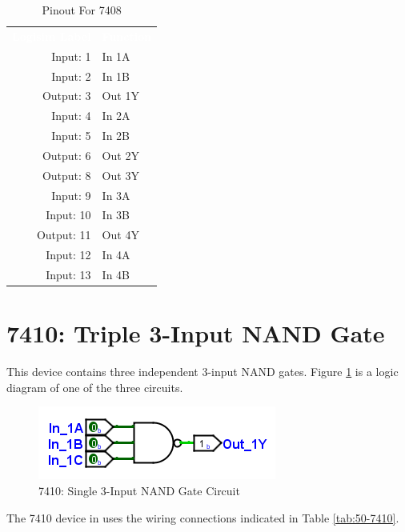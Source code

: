 \begin{table}[H]
	\sffamily
	\newcommand{\head}[1]{\textcolor{white}{\textbf{#1}}}		
	\begin{center}
		\begin{tabular}{rl} 
			\rowcolor{black!75}
			\head{Logisim Label} & \head{Function} \\
			Input: 1   & In 1A  \\
			Input: 2   & In 1B  \\
			Output: 3  & Out 1Y \\
			Input: 4   & In 2A  \\
			Input: 5   & In 2B  \\
			Output: 6  & Out 2Y \\
			Output: 8  & Out 3Y \\
			Input: 9   & In 3A  \\
			Input: 10  & In 3B  \\
			Output: 11 & Out 4Y \\
			Input: 12  & In 4A  \\
			Input: 13  & In 4B  \\
		\end{tabular}
	\end{center}
	\caption{Pinout For 7408}
	\label{tab:50-7408}
\end{table}

\section{7410: Triple 3-Input NAND Gate}

This device contains three independent 3-input NAND gates. Figure \ref{fig:app_ttl-7410} is a logic diagram of one of the three circuits.

\begin{figure}[H]
	\centering
	\includegraphics{gfx/app_ttl-7410}
	\caption{7410: Single 3-Input NAND Gate Circuit}
	\label{fig:app_ttl-7410}
\end{figure}

The 7410 device in \LE uses the wiring connections indicated in Table \ref{tab:50-7410}.

